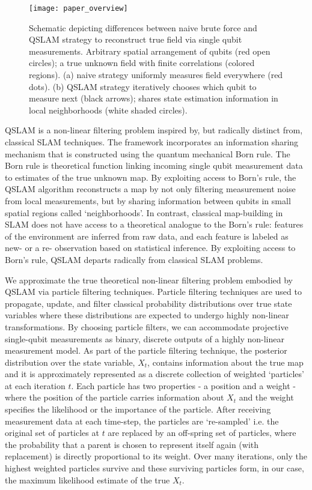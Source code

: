 \documentclass[reprint,longbibliography]{revtex4-1} %
\begin{document}
\begin{figure}
	\texttt{[image: paper\_overview]}
	\caption{\label{fig_paper_overview} Schematic depicting differences between naive brute force and QSLAM strategy to reconstruct true field via single qubit measurements. Arbitrary spatial arrangement of qubits (red open circles); a true unknown field with finite correlations (colored regions). (a) naive strategy uniformly measures field everywhere (red dots). (b) QSLAM strategy iteratively chooses which qubit to measure next (black arrows); shares state estimation information in local neighborhoods (white shaded circles).}  	
\end{figure} 

QSLAM is a non-linear filtering problem inspired by, but radically distinct from, classical SLAM techniques. The framework incorporates an information sharing mechanism that is constructed using the quantum mechanical Born rule. The Born rule is theoretical function linking incoming single qubit measurement data to estimates of the true unknown map. By exploiting access to Born's rule, the QSLAM algorithm reconstructs a map by not only filtering measurement noise from local measurements, but by sharing information between qubits in small spatial regions called `neighborhoods'.  In contrast, classical map-building in SLAM does not have access to a theoretical analogue to the Born's rule: features of the environment are inferred from raw data, and each feature is labeled as new- or a re- observation based on statistical inference. By exploiting access to Born's rule, QSLAM departs radically from classical SLAM problems. 

We approximate the true theoretical non-linear filtering problem embodied by QSLAM via particle filtering techniques. Particle filtering techniques are used to propagate, update, and filter classical probability distributions over true state variables where these distributions are expected to undergo highly non-linear transformations. By choosing particle filters, we can accommodate  projective single-qubit measurements as binary, discrete outputs of a highly non-linear measurement model.  As part of the particle filtering technique, the posterior distribution over the state variable, $X_t$, contains information about the true map and it is approximately represented as a discrete collection of weighted `particles' at each iteration $t$. Each particle has two properties - a position and a weight - where the position of the particle carries information about $X_t$ and the weight specifies the likelihood or the importance of the particle.  After receiving measurement data at each time-step, the particles are `re-sampled' i.e. the original set of particles at $t$ are replaced by an off-spring set of particles, where the probability that a parent is chosen to represent itself again (with replacement) is directly proportional to its weight. Over many iterations, only the highest weighted particles survive and these surviving particles form, in our case, the maximum likelihood estimate of the true $X_t$.
\end{document}
